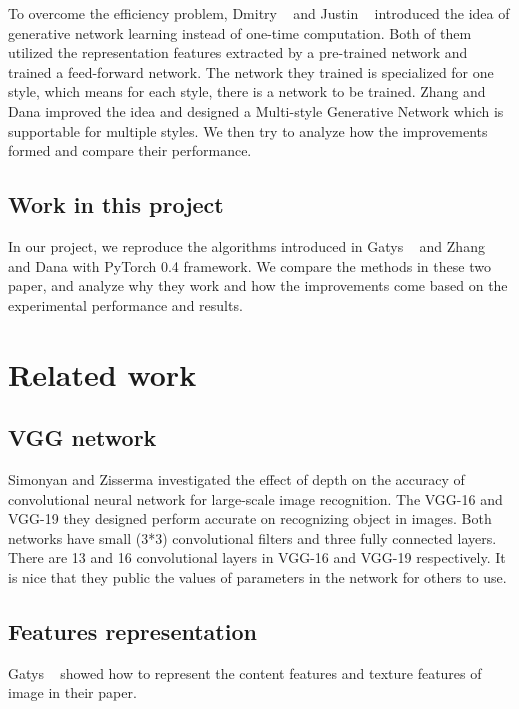 \documentclass[10pt,twocolumn,letterpaper]{article}
\begin{document}
To overcome the efficiency problem, Dmitry \etal~\cite{Authors02} and Justin \etal~\cite{Authors03} introduced the idea of generative network learning instead of one-time computation. Both of them utilized the representation features extracted by a pre-trained network and trained a feed-forward network. The network they trained is specialized for one style, which means for each style, there is a network to be trained. Zhang and Dana \cite{Authors04} improved the idea and designed a Multi-style Generative Network which is supportable for multiple styles. We then try to analyze how the improvements formed and compare their performance. 

\subsection{Work in this project}

In our project, we reproduce the algorithms introduced in Gatys \etal~\cite{Authors01} and Zhang and Dana \cite{Authors04} with PyTorch 0.4 framework. We compare the methods in these two paper, and analyze why they work and how the improvements come based on the experimental performance and results.


\section{Related work}

\subsection{VGG network}
Simonyan and Zisserma \cite{Authors05} investigated the effect of depth on the accuracy of convolutional neural network for large-scale image recognition. The VGG-16 and VGG-19 they designed perform accurate on recognizing object in images. Both networks have small (3*3) convolutional filters and three fully connected layers. There are 13 and 16 convolutional layers in VGG-16 and VGG-19 respectively. It is nice that they public the values of parameters in the network for others to use. 

\subsection{Features representation}
Gatys \etal~\cite{Authors01} showed how to represent the content features and texture features of image in their paper. 
\end{document}

